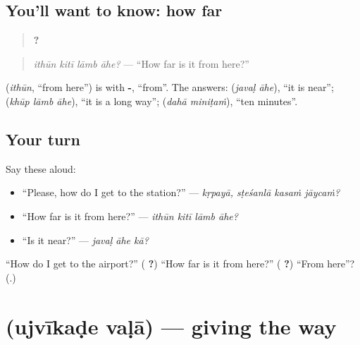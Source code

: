 \subsection*{You'll want to know: how far}
\begin{quote}
\textbf{   ?}
\end{quote}

\begin{quote}
\emph{ithūn kitī lāmb āhe?} — \textquotedblleft{}How far is it from here?\textquotedblright{}
\end{quote}

\textbf{} (\emph{ithūn}, \textquotedblleft{}from here\textquotedblright{}) is \textbf{} with \textbf{-}, \textquotedblleft{}from\textquotedblright{}. The answers: \textbf{ } (\emph{javaḷ āhe}), \textquotedblleft{}it is near\textquotedblright{}; \textbf{  } (\emph{khūp lāmb āhe}), \textquotedblleft{}it is a long way\textquotedblright{}; \textbf{ } (\emph{dahā miniṭaṁ}), \textquotedblleft{}ten minutes\textquotedblright{}.

\subsection*{Your turn}
Say these aloud:

\begin{itemize}
\raggedright
  \item \textquotedblleft{}Please, how do I get to the station?\textquotedblright{} — \emph{kṛpayā, sṭeśanlā kasaṁ jāycaṁ?}
  \item \textquotedblleft{}How far is it from here?\textquotedblright{} — \emph{ithūn kitī lāmb āhe?}
  \item \textquotedblleft{}Is it near?\textquotedblright{} — \emph{javaḷ āhe kā?}
\end{itemize}

\begin{tcolorbox}[breakable,colback=teal!4,colframe=teal!35!black,title={Before you move on}]
\textquotedblleft{}How do I get to the airport?\textquotedblright{} (\textbf{  ?}) \textquotedblleft{}How far is it from here?\textquotedblright{} (\textbf{   ?}) \textquotedblleft{}From here\textquotedblright{}? (\textbf{}.)
\end{tcolorbox}
\section[\texorpdfstring{\mr{उजवीकडे} \mr{वळा} (ujvīkaḍe vaḷā)}{उजवीकडे वळा (ujvīkaḍe vaḷā)}]{  (ujvīkaḍe vaḷā) — giving the way}

